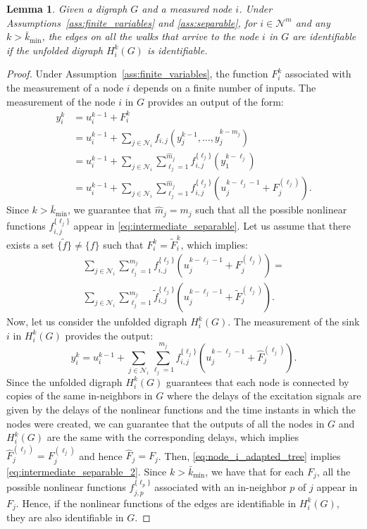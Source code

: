 \documentclass[letterpaper,10pt,journal]{IEEEtran}
\newtheorem{lemma}{Lemma}
\newcommand{\prt}[1]{\left(#1\right)}
\newcommand{\NN}{\mathcal{N}}
\begin{document}
\begin{lemma}\label{lemma:equivalence}
Given a digraph $G$ and a measured node $i$. Under Assumptions~\ref{ass:finite_variables} and \ref{ass:separable}, for $i\in \NN^m$ and any $k>\bar k_{\min}$, the edges on all the walks that arrive to the node $i$ in $G$ are identifiable if the unfolded digraph $H_i^k(G)$ is identifiable.
\end{lemma}
\begin{proof}
    Under Assumption~\ref{ass:finite_variables}, the function $F_i^k$ associated with the measurement of a node $i$ depends on a finite number of inputs.
    The measurement of the node $i$ in $G$ provides an output of the form:
\begin{align}
y_i^k&=u_i^{k-1}+F_i^k\nonumber\\
&=u_i^{k-1}+\sum_{j\in\NN_i}
f_{i,j}(y_j^{k-1},\ldots,y_j^{k-m_j})\nonumber\\
&=u_i^{k-1}+\sum_{j\in\NN_i}\sum_{\ell_j=1}^{\hat m_j} f_{i,j}^{\{\ell_j\}}(y_1^{k-\ell_j})\nonumber\\
&=u_i^{k-1}+\sum_{j\in\NN_i}\sum_{\ell_j=1}^{\hat m_j} f_{i,j}^{\{\ell_j\}}\prt{u_{j}^{k-\ell_j-1}+F_{j}^{(\ell_j)}}.\label{eq:intermediate_separable}
\end{align}
Since $k>\bar k_{\min}$, we guarantee that $\hat m_j=m_j$ such that all the possible nonlinear functions $f_{i,j}^{\{\ell_j\}}$ appear in \eqref{eq:intermediate_separable}.  
   Let us assume that there exists a set $\{\tilde f\}\neq \{ f\}$ such that $F_i^k=\tilde F_i^k$, which implies:
\begin{multline}\label{eq:intermediate_separable_2}
\sum_{j\in\NN_i}\sum_{\ell_j=1}^{m_j} f_{i,j}^{\{\ell_j\}}\prt{u_{j}^{k-\ell_j-1}+F_{j}^{(\ell_j)}}=\\
\sum_{j\in\NN_i}\sum_{\ell_j=1}^{m_j} \tilde f_{i,j}^{\{\ell_j\}}\prt{u_{j}^{k-\ell_j-1}+\tilde F_{j}^{(\ell_j)}}.
\end{multline}
    Now, let us consider the unfolded digraph $H_i^k(G)$. The measurement of the sink $i$ in $H_i^k(G)$ provides the output:
    \begin{equation}\label{eq:node_i_adapted_tree}
    y_i^k=u_i^{k-1}+\sum_{j\in\NN_i}\sum_{\ell_j=1}^{m_j} f_{i,j}^{\{\ell_j\}}\prt{u_{j}^{k-\ell_j-1}+\hat F_{j}^{(\ell_j)}}.    
    \end{equation}
    Since the unfolded digraph $H_i^k(G)$ guarantees that each node is connected by copies of the same in-neighbors in $G$ where the delays of the excitation signals are given by the delays of the nonlinear functions and the time instants in which the nodes were created, we can guarantee that the outputs of all the nodes in $G$ and $H_i^k(G)$ are the same with the corresponding delays, which implies $\hat F_j^{(\ell_j)}=F_j^{(\ell_j)}$ and hence $\hat F_j=F_j$. 
    Then, \eqref{eq:node_i_adapted_tree} implies \eqref{eq:intermediate_separable_2}. Since $k>\bar k_{\min}$, we have that for each $F_j$, all the possible nonlinear functions $f_{j,p}^{\{\ell_p\}}$ associated with an in-neighbor $p$ of $j$ appear in $F_j$.  Hence, if the nonlinear functions of the edges are identifiable in $H_i^k(G)$, they are also identifiable in $G$.
\end{proof}
\end{document}

